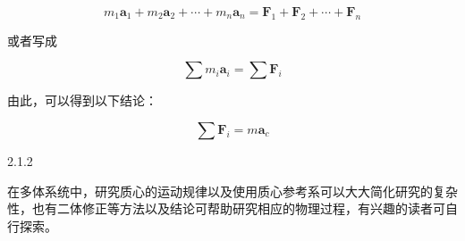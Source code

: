 $$m_{1}\boldsymbol{a}_{1}+m_{2}\boldsymbol{a}_{2}+\cdots+m_{n}\boldsymbol{a}_{n}=\boldsymbol{F}_{1}+\boldsymbol{F}_{2}+\cdots+\boldsymbol{F}_{n}$$

或者写成

$$\sum m_i\boldsymbol{a}_i=\sum\boldsymbol{F}_i$$

由此，可以得到以下结论：
\begin{theorem}[质心运动定理]
    \[
    \sum \boldsymbol{F}_i=m\boldsymbol{a}_c
    \]
\end{theorem}

\begin{knowledge}{ }{2.1.2}

    在多体系统中，研究质心的运动规律以及使用质心参考系可以大大简化研究的复杂性，也有二体修正等方法以及结论可帮助研究相应的物理过程，有兴趣的读者可自行探索。

\end{knowledge}
